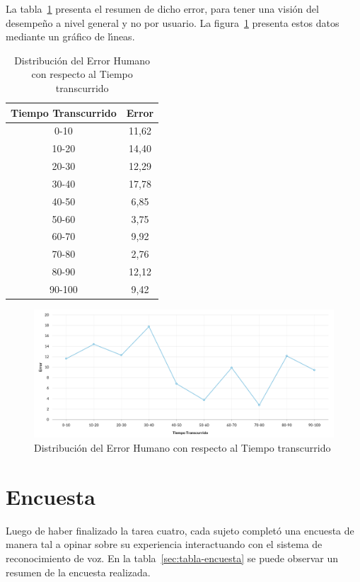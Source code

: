La tabla~\ref{sec:error-tiempo} presenta el resumen de dicho error, para tener una visi\'on del desempe\~no a nivel
general y no por usuario. La figura~\ref{figure:gerror-tiempo} presenta estos datos mediante un gr\'afico 
de l{\'\i}neas.


\begin{table}[H]
\centering
\footnotesize
\begin{tabular}{|c|c|}
\hline
    Tiempo Transcurrido & Error \\
    \hline
0-10  &  11,62 \\
10-20 &  14,40 \\
20-30 &  12,29 \\
30-40 &  17,78 \\
40-50 &  6,85 \\
50-60 &  3,75 \\
60-70 &  9,92 \\
70-80 &  2,76 \\
80-90 &  12,12 \\
90-100 & 9,42 \\
    \hline
\end{tabular}
\caption{Distribuci\'on del Error Humano con respecto al Tiempo transcurrido}
\label{sec:error-tiempo}
\end{table}

\begin{figure}[ht]
\centering
\includegraphics[width=1.0\linewidth]{./graphics/error_tiempo.png}
\caption{Distribuci\'on del Error Humano con respecto al Tiempo transcurrido}
\label{figure:gerror-tiempo}
\end{figure}


\section{Encuesta}

Luego de haber finalizado la tarea cuatro, cada sujeto complet\'o una encuesta de manera tal a
opinar sobre su experiencia interactuando con el sistema de reconocimiento de voz. 
En la tabla~\ref{sec:tabla-encuesta} se puede observar un resumen de la encuesta realizada.


